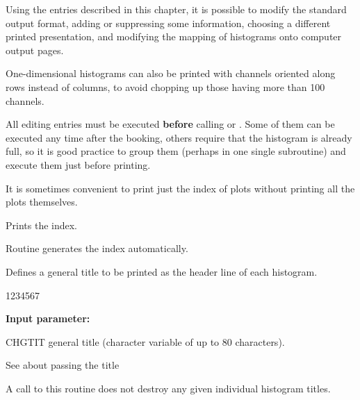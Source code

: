 Using the entries described in this chapter, it is possible to modify
the standard output format, adding or suppressing some information,
choosing a different printed presentation, and modifying the mapping
of histograms onto computer output pages.
 
One-dimensional histograms can also be printed with channels oriented
along rows instead of columns, to avoid chopping up those having
more than 100 channels.
 
All editing entries must be executed
{\bf before} calling  or .
Some of them can be executed any time after
the booking, others require that the histogram is already full, so
it is good practice to group them
(perhaps in one single subroutine) and execute them
just before printing.
 
 
It is sometimes convenient to print just the index of plots without
printing all the plots themselves.
 
 
\Action Prints the index.
 
\Remark
Routine  generates the index automatically.
 
 
\Action Defines
a general title to be printed as the header line of each histogram.
 
\begin{DLtt}{1234567}
\item[{\rm\bf Input parameter:}]
\item[CHGTIT] general title (character variable of up to 80 characters).
\end{DLtt}
 
\Remark
 
\begin{UL}
\item See  about passing the title
\item A call to this routine
does not destroy any given individual histogram titles.
\end{UL}
 
 
